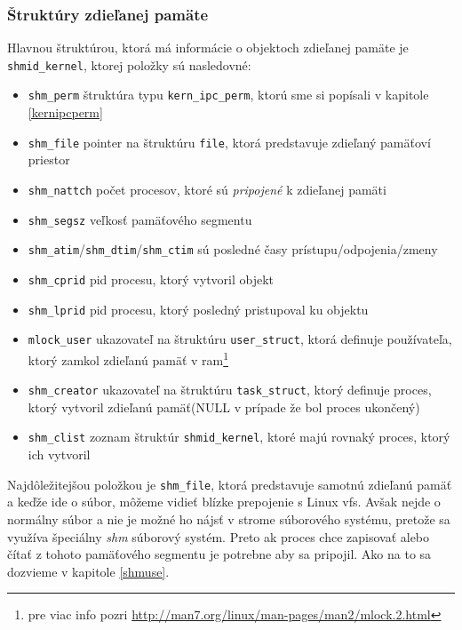\subsubsection{Štruktúry zdieľanej pamäte}
Hlavnou štruktúrou, ktorá má informácie o objektoch zdieľanej pamäte je \texttt{shmid\_kernel}, ktorej položky sú nasledovné:
\begin{itemize}
\item \texttt{shm\_perm} štruktúra typu \texttt{kern\_ipc\_perm}, ktorú sme si popísali v kapitole \ref{kernipcperm}
\item \texttt{shm\_file} pointer na štruktúru \texttt{file}, ktorá predstavuje zdieľaný pamäťoví priestor
\item \texttt{shm\_nattch} počet procesov, ktoré sú \textit{pripojené} k zdieľanej pamäti
\item \texttt{shm\_segsz} veľkosť pamäťového segmentu
\item \texttt{shm\_atim}/\texttt{shm\_dtim}/\texttt{shm\_ctim} sú posledné časy prístupu/odpojenia/zmeny
\item \texttt{shm\_cprid} \acrshort{pid} procesu, ktorý vytvoril objekt
\item \texttt{shm\_lprid} \acrshort{pid} procesu, ktorý posledný pristupoval ku objektu
\item \texttt{mlock\_user} ukazovateľ na štruktúru \texttt{user\_struct}, ktorá definuje používateľa, ktorý zamkol zdieľanú pamäť v \acrshort{ram}\footnote{pre viac info pozri \url{http://man7.org/linux/man-pages/man2/mlock.2.html}}
\item \texttt{shm\_creator} ukazovateľ na štruktúru \texttt{task\_struct}, ktorý definuje proces, ktorý vytvoril zdieľanú pamäť(NULL v prípade že bol proces ukončený)
\item \texttt{shm\_clist} zoznam štruktúr \texttt{shmid\_kernel}, ktoré majú rovnaký proces, ktorý ich vytvoril
\end{itemize}
Najdôležitejšou položkou je \texttt{shm\_file}, ktorá predstavuje samotnú zdieľanú pamäť a keďže ide o súbor, môžeme vidieť blízke prepojenie s Linux \acrshort{vfs}. Avšak nejde o normálny súbor a nie je možné ho nájsť v strome súborového systému, pretože sa využíva špeciálny \textit{shm} súborový systém.\cite{linux} Preto ak proces chce zapisovať alebo čítať z tohoto pamäťového segmentu je potrebne aby sa pripojil. Ako na to sa dozvieme v kapitole \ref{shmuse}.
